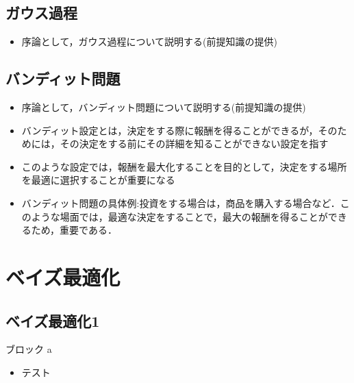 \documentclass[dvipdfmx, 10.5pt]{beamer}
\begin{document}
\subsection{ガウス過程}
\begin{frame}{\insertsubsection}
	\begin{itemize}
		\item 序論として，ガウス過程について説明する(前提知識の提供)
	\end{itemize}

\end{frame}

\subsection{バンディット問題}
\begin{frame}{\insertsubsection}
	\begin{itemize}
		\item 序論として，バンディット問題について説明する(前提知識の提供)
		\item バンディット設定とは，決定をする際に報酬を得ることができるが，そのためには，その決定をする前にその詳細を知ることができない設定を指す
		\item このような設定では，報酬を最大化することを目的として，決定をする場所を最適に選択することが重要になる
		\item バンディット問題の具体例:投資をする場合は，商品を購入する場合など．このような場面では，最適な決定をすることで，最大の報酬を得ることができるため，重要である．
	\end{itemize}
\end{frame}


\section{ベイズ最適化}

\subsection{ベイズ最適化1}
\begin{frame}{\insertsubsection}
	\begin{block}{ブロック}
		a
	\end{block}
	\begin{itemize}
		\item テスト
	\end{itemize}
\end{frame}
\end{document}
